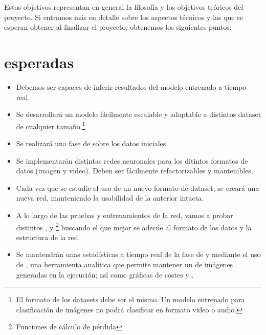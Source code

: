 Estos objetivos representan en general la filosofía y los objetivos teóricos del proyecto. Si entramos más en detalle sobre los aspectos técnicos y las  que se esperan obtener al finalizar el proyecto, obtenemos los siguientes puntos:

\section{ esperadas}

\begin{itemize}
  \item Debemos ser capaces de inferir resultados del modelo entrenado a tiempo real.
  \item Se desarrollará un modelo fácilmente escalable y adaptable a distintos dataset de cualquier tamaño.\footnote{El formato de los datasets debe ser el mismo. Un modelo entrenado para clasificación de imágenes no podrá clasificar en formato video o audio.}
  \item Se realizará una fase de  sobre los datos iniciales.
  \item Se implementarán distintas redes neuronales para los ditintos formatos de datos (imagen y video). Deben ser fácilmente refactorizables y mantenibles.
  \item Cada vez que se estudie el uso de un nuevo formato de dataset, se creará una nueva red, manteniendo la usabilidad de la anterior intacta.
  \item A lo largo de las pruebas y entrenamientos de la red, vamos a probar distintos ,  y \footnote{Funciones de cálculo de pérdida} buscando el que mejor se adecúe al formato de los datos y la estructura de la red.
  \item Se mantendrán unas estadísticas a tiempo real de la fase de  y  mediante el uso de , una herramienta analítica que permite mantener un  de imágenes generadas en la ejecución; así como gráficas de costes y .
\end{itemize}
